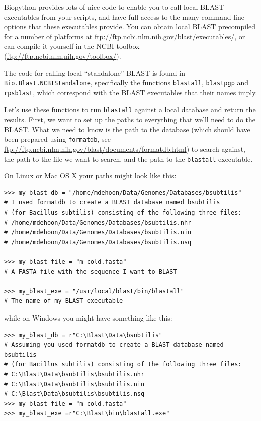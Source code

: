 \documentclass{report}
\begin{document}
Biopython provides lots of nice code to enable you to call local BLAST executables from your scripts, and have full access to the many command line options that these executables provide. You can obtain local BLAST precompiled for a number of platforms at \url{ftp://ftp.ncbi.nlm.nih.gov/blast/executables/}, or can compile it yourself in the NCBI toolbox (\url{ftp://ftp.ncbi.nlm.nih.gov/toolbox/}).

The code for calling local ``standalone'' BLAST is found in \verb|Bio.Blast.NCBIStandalone|, specifically the functions \verb|blastall|, \verb|blastpgp| and \verb|rpsblast|, which correspond with the BLAST executables that their names imply.

Let's use these functions to run \verb|blastall| against a local database and return the results. First, we want to set up the paths to everything that we'll need to do the BLAST. What we need to know is the path to the database (which should have been prepared using \verb|formatdb|, see \url{ftp://ftp.ncbi.nlm.nih.gov/blast/documents/formatdb.html}) to search against, the path to the file we want to search, and the path to the \verb|blastall| executable.

On Linux or Mac OS X your paths might look like this:

\begin{verbatim}
>>> my_blast_db = "/home/mdehoon/Data/Genomes/Databases/bsubtilis"
# I used formatdb to create a BLAST database named bsubtilis
# (for Bacillus subtilis) consisting of the following three files:
# /home/mdehoon/Data/Genomes/Databases/bsubtilis.nhr
# /home/mdehoon/Data/Genomes/Databases/bsubtilis.nin
# /home/mdehoon/Data/Genomes/Databases/bsubtilis.nsq

>>> my_blast_file = "m_cold.fasta"
# A FASTA file with the sequence I want to BLAST

>>> my_blast_exe = "/usr/local/blast/bin/blastall"
# The name of my BLAST executable
\end{verbatim}

\noindent while on Windows you might have something like this:

\begin{verbatim}
>>> my_blast_db = r"C:\Blast\Data\bsubtilis"
# Assuming you used formatdb to create a BLAST database named bsubtilis
# (for Bacillus subtilis) consisting of the following three files:
# C:\Blast\Data\bsubtilis\bsubtilis.nhr
# C:\Blast\Data\bsubtilis\bsubtilis.nin
# C:\Blast\Data\bsubtilis\bsubtilis.nsq
>>> my_blast_file = "m_cold.fasta"
>>> my_blast_exe =r"C:\Blast\bin\blastall.exe"
\end{verbatim}
\end{document}
